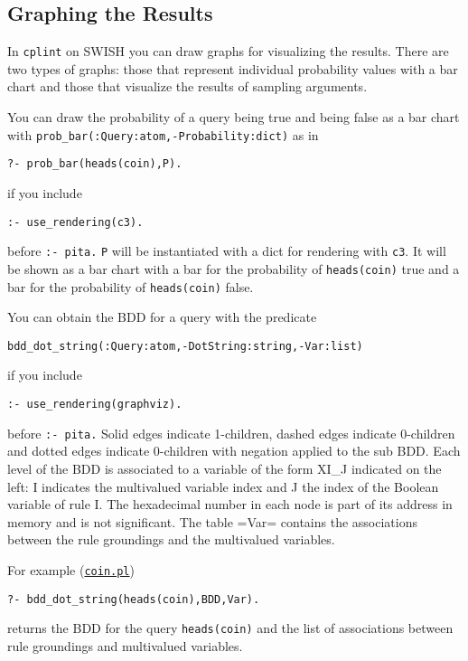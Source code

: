\subsection{Graphing the Results}
\label{graphing}

In \texttt{cplint} on SWISH you can draw graphs
for visualizing the results. There are two types 
of graphs: those that represent individual probability values with a bar chart and those that 
visualize the results of sampling arguments.

You can draw the probability of a query being true and 
being false as a bar chart with \verb|prob_bar(:Query:atom,-Probability:dict)| as in
\begin{verbatim}
?- prob_bar(heads(coin),P).
\end{verbatim}
if you include
\begin{verbatim}
:- use_rendering(c3).
\end{verbatim}
before \verb|:- pita.| \verb|P| will be instantiated with a
dict for rendering with \verb|c3|. It will be shown as a bar chart with
a bar for the probability of \verb|heads(coin)| true and a bar for the probability of \verb|heads(coin)| false.

You can obtain the BDD for a query with the predicate
\begin{verbatim}
bdd_dot_string(:Query:atom,-DotString:string,-Var:list)
\end{verbatim}
if you include
\begin{verbatim}
:- use_rendering(graphviz).
\end{verbatim}
before \verb|:- pita.| 
Solid edges indicate 1-children, dashed edges indicate 0-children and dotted
edges indicate 0-children with negation applied to the sub BDD.
Each level of the BDD is associated to a variable of the form XI\_J indicated on the left:
I indicates the  multivalued variable index and J the index of the Boolean variable of rule I.
The hexadecimal number in each node is part of its address in memory and is not significant.
The table =Var= contains the associations between the rule groundings and the
multivalued variables.

For example (\href{http://cplint.lamping.unife.it/example/inference/coin.pl}{\texttt{coin.pl}})
\begin{verbatim}
?- bdd_dot_string(heads(coin),BDD,Var).
\end{verbatim}
returns the BDD for the query \verb|heads(coin)| and the list of associations between rule groundings and
multivalued variables.

